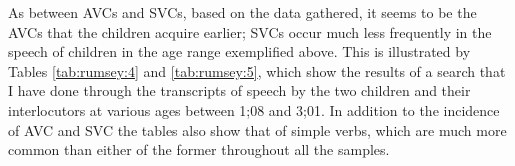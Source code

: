 \documentclass[output=paper]{langsci/langscibook}
\begin{document}
  As between AVCs and SVCs, based on the data gathered, it seems to be the AVCs that the children acquire earlier; SVCs occur much less frequently in the speech of children in the age range exemplified above. This is illustrated by Tables \ref{tab:rumsey:4} and \ref{tab:rumsey:5}, which show the results of a search that I have done through the transcripts of speech by the two children and their interlocutors at various ages between 1;08 and 3;01. In addition to the incidence of AVC and SVC the tables also show that of simple verbs, which are much more common than either of the former throughout all the samples.

\begin{table}
\caption{Incidence of verbs and verb constructions in six samples from  Don  }
\label{tab:rumsey:4}
\end{table}
\end{document}
